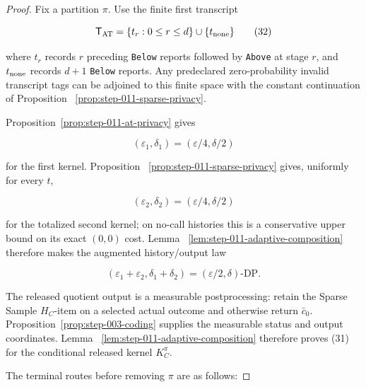 \begin{proof}
Fix a partition \(\pi\). Use the finite first transcript

\[
 \mathsf T_{\rm AT}
 =\{t_r:0\leq r\leq d\}\cup\{t_{\rm none}\}
\tag{32}
\]

where \(t_r\) records \(r\) preceding \texttt{Below} reports followed by \texttt{Above}
at stage \(r\), and \(t_{\rm none}\) records \(d+1\) \texttt{Below} reports. Any
predeclared zero-probability invalid transcript tags can be adjoined to this
finite space with the constant continuation of Proposition
~\ref{prop:step-011-sparse-privacy}.

Proposition~\ref{prop:step-011-at-privacy} gives

\[
 (\varepsilon_1,\delta_1)
 =(\varepsilon/4,\delta/2)
\]

for the first kernel. Proposition
~\ref{prop:step-011-sparse-privacy} gives, uniformly for every \(t\),

\[
 (\varepsilon_2,\delta_2)
 =(\varepsilon/4,\delta/2)
\]

for the totalized second kernel; on no-call histories this is a conservative
upper bound on its exact \((0,0)\) cost. Lemma
~\ref{lem:step-011-adaptive-composition} therefore makes the augmented
history/output law

\[
 (\varepsilon_1+\varepsilon_2,
   \delta_1+\delta_2)
 =(\varepsilon/2,\delta)\text{-DP}.
\tag{33}
\]

The released quotient output is a measurable postprocessing: retain the
Sparse Sample \(H_C\)-item on a selected actual outcome and otherwise return
\(\bar c_0\). Proposition~\ref{prop:step-003-coding} supplies the
measurable status and output coordinates. Lemma
~\ref{lem:step-011-adaptive-composition} therefore proves (31) for the
conditional released kernel \(K_C^{\pi}\).

The terminal routes before removing \(\pi\) are as follows:


\end{proof}
